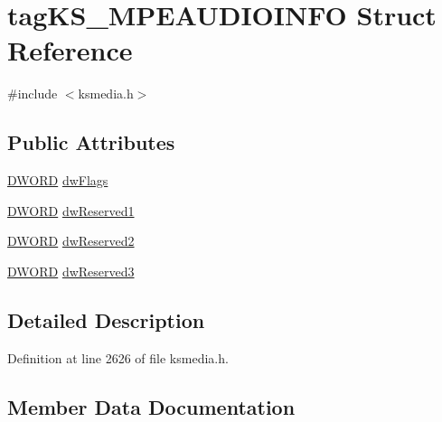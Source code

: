 \hypertarget{structtag_k_s___m_p_e_a_u_d_i_o_i_n_f_o}{}\section{tag\+K\+S\+\_\+\+M\+P\+E\+A\+U\+D\+I\+O\+I\+N\+FO Struct Reference}
\label{structtag_k_s___m_p_e_a_u_d_i_o_i_n_f_o}


{\ttfamily \#include $<$ksmedia.\+h$>$}

\subsection*{Public Attributes}
\begin{DoxyCompactItemize}
\item 
\hyperlink{mapinls_8h_ad342ac907eb044443153a22f964bf0af}{D\+W\+O\+RD} \hyperlink{structtag_k_s___m_p_e_a_u_d_i_o_i_n_f_o_a5df00cbfe1dc9a1cdd55cb88e425c1c0}{dw\+Flags}
\item 
\hyperlink{mapinls_8h_ad342ac907eb044443153a22f964bf0af}{D\+W\+O\+RD} \hyperlink{structtag_k_s___m_p_e_a_u_d_i_o_i_n_f_o_ade1caf2f1127bc2c9cf24fffcdc39e37}{dw\+Reserved1}
\item 
\hyperlink{mapinls_8h_ad342ac907eb044443153a22f964bf0af}{D\+W\+O\+RD} \hyperlink{structtag_k_s___m_p_e_a_u_d_i_o_i_n_f_o_a8e31fd46d0bfa61791dd71e63704bb9d}{dw\+Reserved2}
\item 
\hyperlink{mapinls_8h_ad342ac907eb044443153a22f964bf0af}{D\+W\+O\+RD} \hyperlink{structtag_k_s___m_p_e_a_u_d_i_o_i_n_f_o_a73d298bb909e7ebd3917bb28c01a1faf}{dw\+Reserved3}
\end{DoxyCompactItemize}


\subsection{Detailed Description}


Definition at line 2626 of file ksmedia.\+h.



\subsection{Member Data Documentation}
